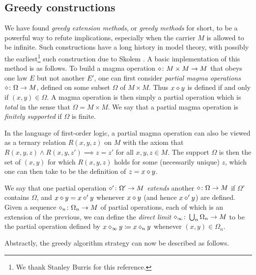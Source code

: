 \subsection{Greedy constructions}\label{greedy-sec}

We have found \emph{greedy extension methods}, or \emph{greedy methods} for short, to be a powerful way to refute implications, especially when the carrier $M$ is allowed to be infinite.  Such constructions have a long history in model theory, with possibly the earliest\footnote{We thank Stanley Burris for this reference.} such construction due to Skolem \cite{skolem}. A basic implementation of this method is as follows.  To build a magma operation $\diamond \colon M \times M \to M$ that obeys one law $E$ but not another $E'$, one can first consider \emph{partial magma operations} $\diamond \colon \Omega \to M$, defined on some subset $\Omega$ of $M \times M$. Thus $x \diamond y$ is defined if and only if $(x,y) \in \Omega$. A magma operation is then simply a partial operation which is \emph{total} in the sense that $\Omega = M \times M$.  We say that a partial magma operation is \emph{finitely supported} if $\Omega$ is finite.

In the language of first-order logic, a partial magma operation can also be viewed as a ternary relation $R(x,y,z)$ on $M$ with the axiom that $R(x,y,z) \wedge R(x,y,z') \implies z=z'$ for all $x,y,z \in M$.  The support $\Omega$ is then the set of $(x,y)$ for which $R(x,y,z)$ holds for some (necessarily unique) $z$, which one can then take to be the definition of $z = x \diamond y$.

We say that one partial operation $\diamond' \colon \Omega' \to M$ \emph{extends} another $\diamond \colon \Omega \to M$ if $\Omega'$ contains $\Omega$, and $x \diamond y = x \diamond' y$ whenever $x \diamond y$ (and hence $x \diamond' y$) are defined. Given a sequence $\diamond_n \colon \Omega_n \to M$ of partial operations, each of which is an extension of the previous, we can define the \emph{direct limit} $\diamond_\infty \colon \bigcup_n \Omega_n \to M$ to be the partial operation defined by $x \diamond_\infty y \coloneqq x \diamond_n y$ whenever $(x,y) \in \Omega_n$.

Abstractly, the greedy algorithm strategy can now be described as follows.

